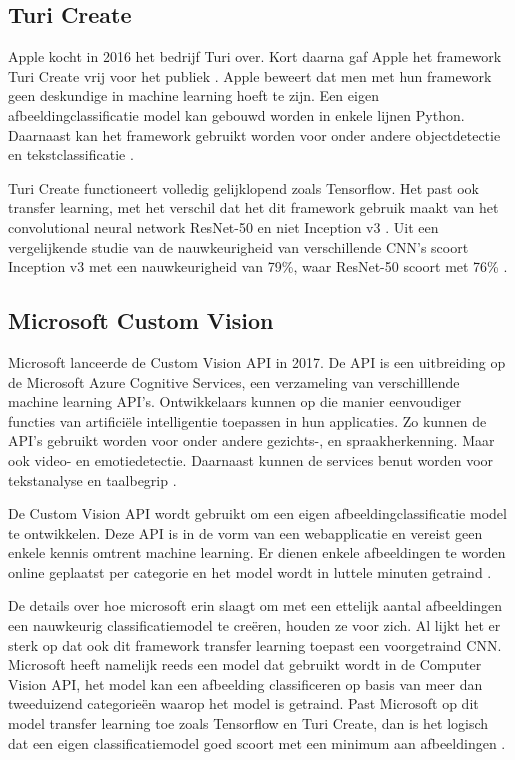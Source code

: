 \subsection{Turi Create}
\label{ssec:Turi Create}

Apple kocht in 2016 het bedrijf Turi over. Kort daarna gaf Apple het framework Turi Create vrij voor het publiek \autocite{9to5mac}. Apple beweert dat men met hun framework geen deskundige in machine learning hoeft te zijn. Een eigen afbeeldingclassificatie model kan gebouwd worden in enkele lijnen Python. Daarnaast kan het framework gebruikt worden voor onder andere objectdetectie en tekstclassificatie \autocite{githubturi}.

Turi Create functioneert volledig gelijklopend zoals Tensorflow. Het past ook transfer learning, met het verschil dat het dit framework gebruik maakt van het convolutional neural network ResNet-50 en niet Inception v3 \autocite{hackermoon}. Uit een vergelijkende studie van de nauwkeurigheid van verschillende CNN’s scoort Inception v3 met een nauwkeurigheid van 79\%, waar ResNet-50 scoort met 76\% \autocite{arxiv}.

\subsection{Microsoft Custom Vision}
\label{ssec:Microsoft Custom Vision}

Microsoft lanceerde de Custom Vision API in 2017. De API is een uitbreiding op de Microsoft Azure Cognitive Services, een verzameling van verschilllende machine learning API’s. Ontwikkelaars kunnen op die manier eenvoudiger functies van artificiële intelligentie toepassen in hun applicaties. Zo kunnen de API’s gebruikt worden voor onder andere gezichts-, en spraakherkenning. Maar ook video- en emotiedetectie. Daarnaast kunnen de services benut worden voor tekstanalyse en taalbegrip \autocite{cognitiveservices}.

De Custom Vision API wordt gebruikt om een eigen afbeeldingclassificatie model te ontwikkelen. Deze API is in de vorm van een webapplicatie en vereist geen enkele kennis omtrent machine learning. Er dienen enkele afbeeldingen te worden online geplaatst per categorie en het model wordt in luttele minuten getraind \autocite{appliedies}.

De details over hoe microsoft erin slaagt om met een ettelijk aantal afbeeldingen een nauwkeurig classificatiemodel te creëren, houden ze voor zich. Al lijkt het er sterk op dat ook dit framework transfer learning toepast een voorgetraind CNN. Microsoft heeft namelijk reeds een model dat gebruikt wordt in de Computer Vision API, het model kan een afbeelding classificeren op basis van meer dan tweeduizend categorieën waarop het model is getraind. Past Microsoft op dit model transfer learning toe zoals Tensorflow en Turi Create, dan is het logisch dat een eigen classificatiemodel goed scoort met een minimum aan afbeeldingen \autocite{praeclarum}.







